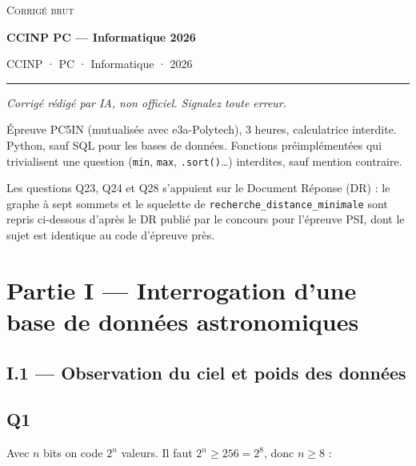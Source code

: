 \documentclass[11pt,a4paper]{article}
\newcommand{\equationajustee}[1]{%
  \sbox{\boiteequation}{$\displaystyle #1$}%
  \ifdim\wd\boiteequation>\linewidth
    \[\resizebox{\linewidth}{!}{\usebox{\boiteequation}}\]%
  \else
    \[#1\]%
  \fi}
\begin{document}
\thispagestyle{plain}
\begin{center}
  {\small\scshape Corrigé brut}\par\smallskip
  {\LARGE\bfseries CCINP PC — Informatique 2026\par}\medskip
  {\large CCINP · PC · Informatique · 2026\par}
\end{center}
\vspace{2pt}\hrule\vspace{8pt}

\emph{Corrigé rédigé par IA, non officiel. Signalez toute erreur.}

Épreuve PC5IN (mutualisée avec e3a-Polytech), 3 heures, calculatrice interdite. Python, sauf SQL pour les bases de données. Fonctions préimplémentées qui trivialisent une question (\texttt{min}, \texttt{max}, \texttt{.sort()}\ldots) interdites, sauf mention contraire.

Les questions Q23, Q24 et Q28 s'appuient sur le Document Réponse (DR) : le graphe à sept sommets et le squelette de \texttt{recherche\_distance\_minimale} sont repris ci-dessous d'après le DR publié par le concours pour l'épreuve PSI, dont le sujet est identique au code d'épreuve près.

\hypertarget{partie-i-interrogation-dune-base-de-donnuxe9es-astronomiques}{%
\section{Partie I --- Interrogation d'une base de données astronomiques}\label{partie-i-interrogation-dune-base-de-donnuxe9es-astronomiques}}

\hypertarget{i.1-observation-du-ciel-et-poids-des-donnuxe9es}{%
\subsection{I.1 --- Observation du ciel et poids des données}\label{i.1-observation-du-ciel-et-poids-des-donnuxe9es}}

\hypertarget{q1}{%
\subsection{Q1}\label{q1}}

Avec \(n\) bits on code \(2^n\) valeurs. Il faut \(2^n \geqslant 256 = 2^8\), donc \(n \geqslant 8\) :

\equationajustee{\boxed{8 \text{ bits, soit 1 octet par pixel}}}
\end{document}
